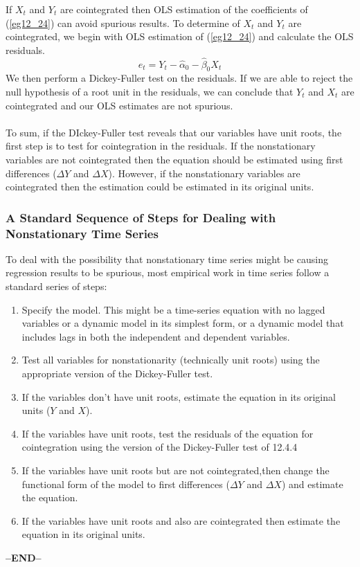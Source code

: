 \documentclass[11pt]{article}
\begin{document}
If $X_t$ and $Y_t$ are cointegrated then OLS estimation of the coefficients of (\ref{eg12_24}) can avoid spurious results. To determine of $X_t$ and $Y_t$ are cointegrated, we begin with OLS estimation of (\ref{eg12_24}) and calculate the OLS residuals.
\begin{equation}
e_t = Y_t - \hat{\alpha}_0 - \hat{\beta}_0X_t \label{eg12_31}
\end{equation}
We then perform a Dickey-Fuller test on the residuals. If we are able to reject the null hypothesis of a root unit in the residuals, we can conclude that $Y_t$ and $X_t$ are cointegrated and our OLS estimates are not spurious.\\ \\
To sum, if the DIckey-Fuller test reveals that our variables have unit roots, the first step is to test for cointegration in the residuals. If the nonstationary variables are not cointegrated then the equation should be estimated using first differences ($\Delta Y$ and $\Delta X$). However, if the nonstationary variables are cointegrated then the estimation could be estimated in its original units.
\subsubsection{A Standard Sequence of Steps for Dealing with Nonstationary Time Series}
To deal with the possibility that nonstationary time series might be causing regression results to be spurious, most empirical work in time series follow a standard series of steps:
\begin{enumerate}
\item Specify the model. This might be a time-series equation with no lagged variables or a dynamic model in its simplest form, or a dynamic model that includes lags in both the independent and dependent variables.
\item Test all variables for nonstationarity (technically unit roots) using the appropriate version of the Dickey-Fuller test.
\item If the variables don't have unit roots, estimate the equation in its original units ($Y$ and $X$).
\item If the variables have unit roots, test the residuals of the equation for cointegration using the version of the Dickey-Fuller test of 12.4.4
\item If the variables have unit roots but are not cointegrated,then change the functional form of the model to first differences ($\Delta Y$ and $\Delta X$) and estimate the equation.
\item If the variables have unit roots and also are cointegrated then estimate the equation in its original units.
\end{enumerate}
\begin{center}
\textbf{--END--}
\end{center}
\end{document}
